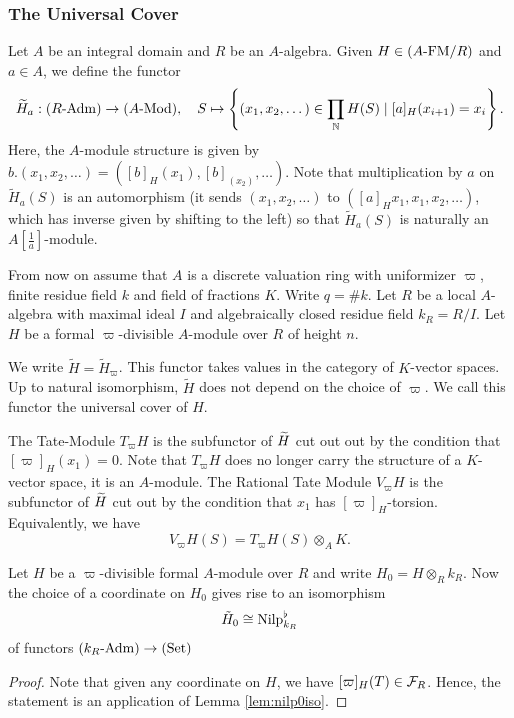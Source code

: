 \documentclass[../main.tex]{subfiles}
\begin{document}
\subsubsection{The Universal Cover} %
\label{ssub:The Universal Cover}
Let $A$ be an integral domain and $R$ be an $A$-algebra. Given $H \in \FMOver
AR$ and $a \in A$,
we define the functor 
\begin{equation*}
  \Tilde H_a : \Adm R \to \Mod {A}, \quad
  S \mapsto \left\{(x_1, x_2, \dots) \in \prod_{\N} H(S) \mid [a]_H(x_{i+1}) =
  x_i \right\}.
\end{equation*}
Here, the $A$-module structure is given by $b.(x_1, x_2,\dots) = ([b]_H(x_1), [b]_(x_2),
\dots)$. Note that multiplication by $a$ on $\tilde H_a(S)$ is an automorphism
(it sends $(x_1, x_2, \dots)$ to $([a]_H x_1, x_1, x_2, \dots)$, which has inverse given
by shifting to the left)  so that $\tilde H_a(S)$ is naturally an
$A[\frac1a]$-module.

From now on assume that $A$ is a discrete valuation ring with uniformizer
$\varpi$, finite residue field $k$ and field of fractions $K$. 
Write $q = \# k$. Let $R$ be a local $A$-algebra with maximal ideal $I$ and
algebraically closed residue field $k_R = R/I$. Let $H$ be a formal
$\varpi$-divisible $A$-module over $R$ of height $n$. 
\begin{defi}
  We write $\tilde H = \tilde H_\varpi$. This functor
  takes values in the category of $K$-vector spaces.
  Up to natural isomorphism, $\tilde H$ does not depend on the choice of 
  $\varpi$. We call this functor the universal cover of $H$. 

  The Tate-Module $T_\varpi H$ is the subfunctor of $\Tilde H$ cut out out
  by the condition that $[\varpi]_H(x_1) = 0$. Note that $T_\varpi H$ does no longer 
  carry the structure of a $K$-vector space, it is an $A$-module. The Rational
  Tate Module $V_\varpi H$ is the subfunctor of $\Tilde H$ cut out by the
  condition that $x_1$ has $[\varpi]_H$-torsion. Equivalently, we have 
  \begin{equation*}
    V_\varpi H (S) = T_\varpi H(S) \otimes_A K.
  \end{equation*}
\end{defi}

\begin{lem}
  Let $H$ be a $\varpi$-divisible formal $A$-module over $R$ and write $H_0 = H
  \otimes_R k_R$. Now the choice of a coordinate on $H_0$ gives rise to
  an isomorphism 
  \begin{equation*}
    \tilde H_0 \cong \Nilp^\flat_{k_R}
  \end{equation*}
  of functors $\Adm {k_R} \to \Set$
  \begin{proof}
    Note that given any coordinate on $H$, we have $[\varpi]_H(T) \in \cF_R$. Hence,
    the statement is an application of Lemma \ref{lem:nilp0iso}.
  \end{proof}
\end{lem}
\end{document}
